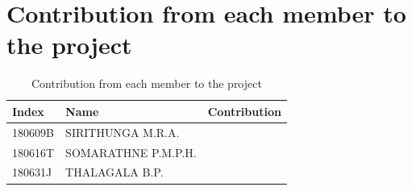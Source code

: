 \documentclass[a4paper,11pt]{article}
\begin{document}

\tableofcontents
\section*{\textbf{{Contribution from each member to the project}}}
\begin{table}[!h]
	\centering

		\begin{tabular}{|l|l|l|}
			\hline
			\textbf{Index}	&\textbf{Name} 	&\textbf{Contribution}\\ \hline
		180609B  	&SIRITHUNGA M.R.A. & \\ \hline

 		180616T  	&SOMARATHNE P.M.P.H. &\\ \hline

 		180631J		&THALAGALA B.P.&\\ \hline
		\end{tabular}

			\caption{Contribution from each member to the project}
\end{table}
\pagebreak
\end{document}
